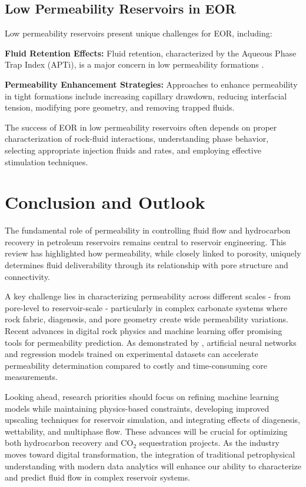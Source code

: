 \documentclass[journal]{IEEEtran}
\begin{document}
\subsection{Low Permeability Reservoirs in EOR}
Low permeability reservoirs present unique challenges for EOR, including:

\textbf{Fluid Retention Effects:} Fluid retention, characterized by the Aqueous Phase Trap Index (APTi), is a major concern in low permeability formations \parencite{chapuis_use_2003}.

\textbf{Permeability Enhancement Strategies:} Approaches to enhance permeability in tight formations include increasing capillary drawdown, reducing interfacial tension, modifying pore geometry, and removing trapped fluids.

The success of EOR in low permeability reservoirs often depends on proper characterization of rock-fluid interactions, understanding phase behavior, selecting appropriate injection fluids and rates, and employing effective stimulation techniques.

\section{Conclusion and Outlook}

The fundamental role of permeability in controlling fluid flow and hydrocarbon recovery in petroleum reservoirs remains central to reservoir engineering. This review has highlighted how permeability, while closely linked to porosity, uniquely determines fluid deliverability through its relationship with pore structure and connectivity.

A key challenge lies in characterizing permeability across different scales - from pore-level to reservoir-scale - particularly in complex carbonate systems where rock fabric, diagenesis, and pore geometry create wide permeability variations. Recent advances in digital rock physics and machine learning offer promising tools for permeability prediction. As demonstrated by \textcite{zolotukhin_machine_2019}, artificial neural networks and regression models trained on experimental datasets can accelerate permeability determination compared to costly and time-consuming core measurements.

Looking ahead, research priorities should focus on refining machine learning models while maintaining physics-based constraints, developing improved upscaling techniques for reservoir simulation, and integrating effects of diagenesis, wettability, and multiphase flow. These advances will be crucial for optimizing both hydrocarbon recovery and $\mathrm{CO_2}$ sequestration projects. As the industry moves toward digital transformation, the integration of traditional petrophysical understanding with modern data analytics will enhance our ability to characterize and predict fluid flow in complex reservoir systems.

\newpage
\printbibliography[heading=bibintoc]
\end{document}
